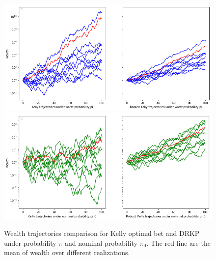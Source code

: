 \documentclass[12pt]{article}
\begin{document}
\begin{figure} 
\centering
\includegraphics[width=1.\textwidth]{./Plot/Horse1}
\includegraphics[width=1.\textwidth]{./Plot/Horse2}
\caption{Wealth trajectories comparison for Kelly optimal bet and DRKP under probability $\pi$ and nominal probability $\pi_0$. The red line are the mean of wealth over different realizations.}
\label{fig-time-domain-trajectories}
\end{figure}

\end{document}
